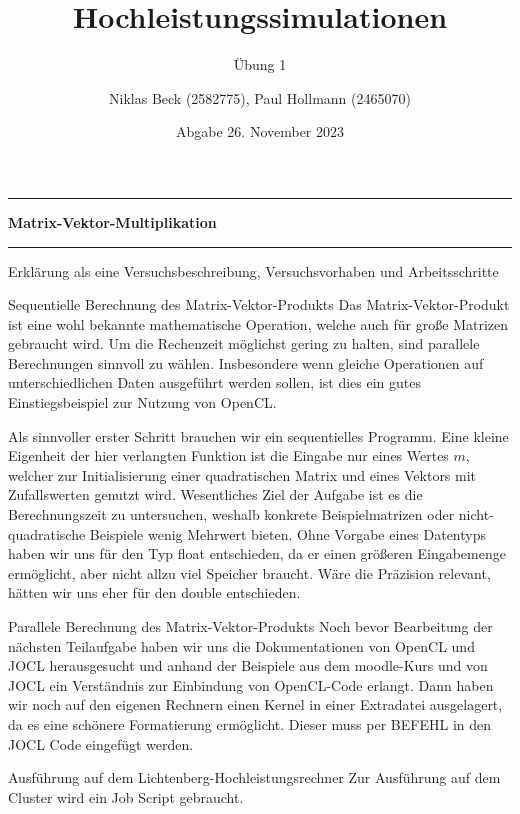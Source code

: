 \documentclass[
ngerman,
subtask=ruled %
]{tudaexercise}
\begin{document}
	
	\title[Übung Hochleistungssimulationen]{Hochleistungssimulationen}
	\subtitle{\"Ubung 1}
	\author{Niklas Beck (2582775), Paul Hollmann (2465070)}
	\date{Abgabe 26. November 2023}
	\maketitle
	
	\hrule
	{\Large \textbf{Matrix-Vektor-Multiplikation}}
	\hrule
	
	Erklärung als eine Versuchsbeschreibung, Versuchsvorhaben und Arbeitsschritte
	
	\begin{task}{Sequentielle Berechnung des Matrix-Vektor-Produkts}
		Das Matrix-Vektor-Produkt ist eine wohl bekannte mathematische Operation, welche auch für große Matrizen gebraucht wird.
		Um die Rechenzeit möglichst gering zu halten, sind parallele Berechnungen sinnvoll zu wählen. Insbesondere wenn gleiche Operationen auf unterschiedlichen Daten ausgeführt werden sollen, ist dies ein gutes Einstiegsbeispiel zur Nutzung von OpenCL.
		
		Als sinnvoller erster Schritt brauchen wir ein sequentielles Programm.
		Eine kleine Eigenheit der hier verlangten Funktion ist die Eingabe nur eines Wertes $m$, welcher zur Initialisierung einer quadratischen Matrix und eines Vektors mit Zufallswerten genutzt wird. Wesentliches Ziel der Aufgabe ist es die Berechnungszeit zu untersuchen, weshalb konkrete Beispielmatrizen oder nicht-quadratische Beispiele wenig Mehrwert bieten.
		Ohne Vorgabe eines Datentyps haben wir uns für den Typ float entschieden, da er einen größeren Eingabemenge ermöglicht, aber nicht allzu viel Speicher braucht. Wäre die Präzision relevant, hätten wir uns eher für den double entschieden.
	\end{task}
	
	
	\begin{task}{Parallele Berechnung des Matrix-Vektor-Produkts}
		Noch bevor Bearbeitung der nächsten Teilaufgabe haben wir uns die Dokumentationen von OpenCL und JOCL herausgesucht und anhand der Beispiele aus dem moodle-Kurs und von JOCL ein Verständnis zur Einbindung von OpenCL-Code erlangt.
		Dann haben wir noch auf den eigenen Rechnern einen Kernel in einer Extradatei ausgelagert, da es eine schönere Formatierung ermöglicht.
		Dieser muss per BEFEHL in den JOCL Code eingefügt werden.
	\end{task}
	
	
	\begin{task}{Ausführung auf dem Lichtenberg-Hochleistungsrechner} 
		Zur Ausführung auf dem Cluster wird ein Job Script gebraucht.
		
	\end{task}
\end{document}
